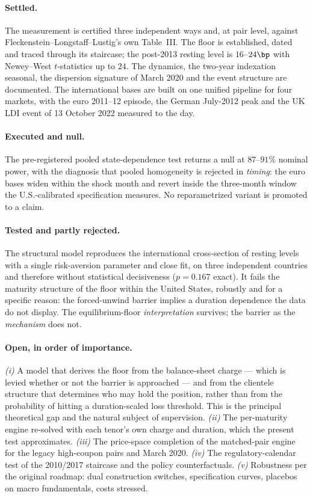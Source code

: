 \documentclass[11pt]{article}
\begin{document}
\paragraph{Settled.} The measurement is certified three independent ways and, at pair level,
against Fleckenstein--Longstaff--Lustig's own Table~III. The floor is established, dated and traced
through its staircase; the post-2013 resting level is $16$--$24\bp$ with Newey--West $t$-statistics
up to $24$. The dynamics, the two-year indexation seasonal, the dispersion signature of March 2020
and the event structure are documented. The international bases are built on one unified pipeline
for four markets, with the euro 2011--12 episode, the German July-2012 peak and the UK LDI event of
13 October 2022 measured to the day.

\paragraph{Executed and null.} The pre-registered pooled state-dependence test returns a null at
$87$--$91\%$ nominal power, with the diagnosis that pooled homogeneity is rejected in \emph{timing}:
the euro bases widen within the shock month and revert inside the three-month window the
U.S.-calibrated specification measures. No reparametrized variant is promoted to a claim.

\paragraph{Tested and partly rejected.} The structural model reproduces the international
cross-section of resting levels with a single risk-aversion parameter and close fit, on three
independent countries and therefore without statistical decisiveness ($p=0.167$ exact). It fails
the maturity structure of the floor within the United States, robustly and for a specific reason:
the forced-unwind barrier implies a duration dependence the data do not display. The
equilibrium-floor \emph{interpretation} survives; the barrier as the \emph{mechanism} does not.

\paragraph{Open, in order of importance.} \emph{(i)} A model that derives the floor from the
balance-sheet charge --- which is levied whether or not the barrier is approached --- and from the
clientele structure that determines who may hold the position, rather than from the probability of
hitting a duration-scaled loss threshold. This is the principal theoretical gap and the natural
subject of supervision. \emph{(ii)} The per-maturity engine re-solved with each tenor's own charge
and duration, which the present test approximates. \emph{(iii)} The price-space completion of the
matched-pair engine for the legacy high-coupon pairs and March 2020. \emph{(iv)} The
regulatory-calendar test of the 2010/2017 staircase and the policy counterfactuals. \emph{(v)}
Robustness per the original roadmap: dual construction switches, specification curves, placebos on
macro fundamentals, costs stressed.
\end{document}
